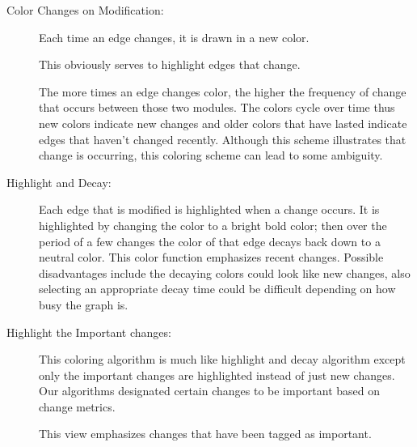 \documentclass[times, 10pt,twocolumn]{article}
\begin{document}
\begin{description}

\label{sec:coloring}

\item[Color Changes on Modification:] 

Each time an edge changes, it is drawn in a new color.

    
    This obviously serves to highlight edges that change. 
    
    
    
    
    
    The more
    times an edge changes color, the higher the frequency of change that
    occurs between those two modules.  The colors cycle over time thus new
    colors indicate new changes and older colors that have lasted indicate
    edges that haven't changed recently. Although this scheme illustrates
    that change is occurring, this coloring scheme can lead to some
    ambiguity.  
    

\item[Highlight and Decay:] Each edge that is modified is highlighted when
    a change occurs. It is highlighted by changing the color to a bright
    bold color; then over the period of a few changes the color of that
    edge decays back down to a neutral color. This color function
    emphasizes recent changes. Possible disadvantages include the decaying
    colors could look like new changes, also selecting an appropriate decay
    time could be difficult depending on how busy the graph is.

\item[Highlight the Important changes:] This coloring algorithm is much
    like highlight and decay algorithm except only the important changes
    are highlighted instead of just new changes. 
    Our algorithms designated certain changes to be important based
        on change metrics.
    
    This view emphasizes
    changes that have been tagged as important.

\end{description}
\end{document}
